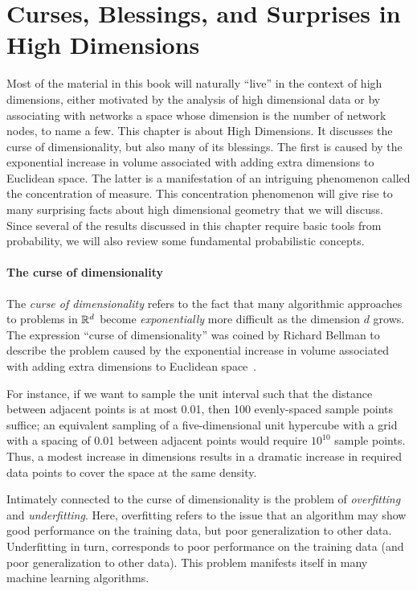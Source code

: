 
\chapter{Curses, Blessings, and Surprises in High Dimensions}
\label{c:surprises}


Most of the material in this book will naturally ``live'' in the context of high dimensions, either motivated by the analysis of high dimensional data or by associating with networks a space whose dimension is the number of network nodes, %
to name a few. This chapter is about High Dimensions. It discusses the curse of dimensionality, but also many of its blessings. The first is caused by the exponential increase in volume associated with adding extra dimensions to Euclidean space. The latter is a manifestation of an intriguing phenomenon called the concentration of measure. This concentration phenomenon will give rise to many surprising facts about high dimensional geometry that we will discuss.
Since several of the results discussed in this chapter require basic tools from probability, we will also review some fundamental probabilistic concepts.

\subsubsection{The curse of dimensionality}

The {\em curse of dimensionality} refers to the fact that many algorithmic approaches to problems in
$\mathbb{R}^d$ become {\em exponentially} more difficult as the dimension $d$ grows. The expression ``curse of dimensionality'' was coined by Richard Bellman to describe the problem caused by the exponential increase in volume associated with adding extra dimensions to Euclidean space~\cite{bellman1957}.



For instance, if we want to sample the unit interval such that the distance between adjacent points is at most 0.01,
then 100 evenly-spaced sample points suffice; an equivalent sampling of a five-dimensional unit hypercube with a grid with a spacing of 0.01 between adjacent points would require $10^{10}$ sample points. Thus, a modest increase in dimensions results in a dramatic increase in required data points to cover the space at the same density.



Intimately connected to the curse of dimensionality is the problem of {\em overfitting} and {\em underfitting}. Here, overfitting refers to the issue that an algorithm may show good performance on the training data, but poor generalization to other data. Underfitting in turn, corresponds to poor performance on the training data (and poor generalization to other data). This problem manifests itself in many machine learning algorithms.

